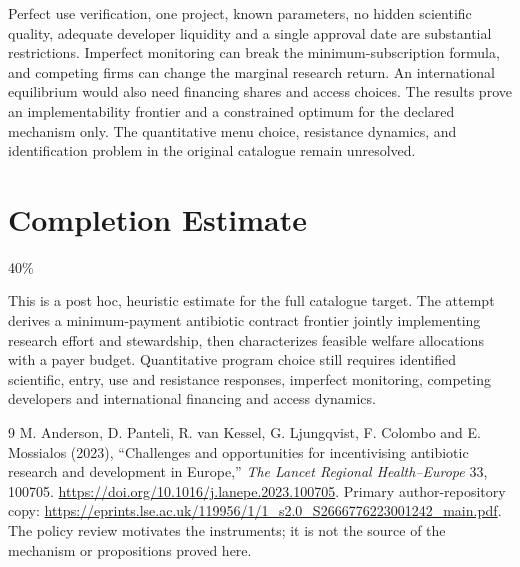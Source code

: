 \documentclass[11pt,a4paper]{article}
\theoremstyle{definition}
\theoremstyle{remark}
\begin{document}
Perfect use verification, one project, known parameters, no hidden scientific quality, adequate developer liquidity and a single approval date are substantial restrictions. Imperfect monitoring can break the minimum-subscription formula, and competing firms can change the marginal research return. An international equilibrium would also need financing shares and access choices. The results prove an implementability frontier and a constrained optimum for the declared mechanism only. The quantitative menu choice, resistance dynamics, and identification problem in the original catalogue remain unresolved.

\section{Completion Estimate}
40\%

This is a post hoc, heuristic estimate for the full catalogue target.
The attempt derives a minimum-payment antibiotic contract frontier jointly implementing research effort and stewardship, then characterizes feasible welfare allocations with a payer budget. Quantitative program choice still requires identified scientific, entry, use and resistance responses, imperfect monitoring, competing developers and international financing and access dynamics.

\begin{thebibliography}{9}
 M. Anderson, D. Panteli, R. van Kessel, G. Ljungqvist, F. Colombo and E. Mossialos (2023), ``Challenges and opportunities for incentivising antibiotic research and development in Europe,'' \emph{The Lancet Regional Health--Europe} 33, 100705. \url{https://doi.org/10.1016/j.lanepe.2023.100705}. Primary author-repository copy: \url{https://eprints.lse.ac.uk/119956/1/1_s2.0_S2666776223001242_main.pdf}. The policy review motivates the instruments; it is not the source of the mechanism or propositions proved here.
\end{thebibliography}
\end{document}

